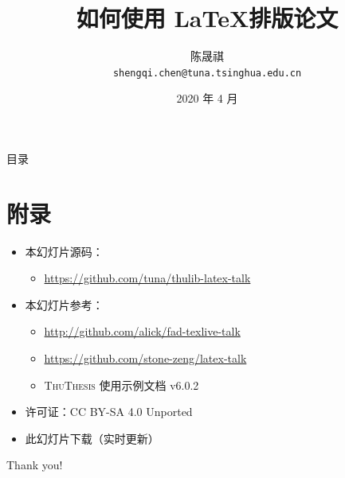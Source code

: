 \documentclass[xcolor=table,dvipsnames,svgnames,aspectratio=169,fontset=fandol,punct=kaiming]{ctexbeamer}
\title
{如何使用 \LaTeX 排版论文}
\author[陈晟祺] %
{陈晟祺\\ \texttt{shengqi.chen@tuna.tsinghua.edu.cn}}
\institute{清华大学 TUNA 协会}
\date[图书馆专题培训讲座]{2020 年 4 月}
\newcommand{\ThuThesis}{\textsc{ThuThesis}\xspace}
\newcommand\link[1]{\href{#1}{\faLink}}
\begin{document}
\begin{frame}
  \titlepage
\end{frame}

\begin{frame}{目录}
  \tableofcontents
\end{frame}







\section*{附录}


\begin{frame}
  \begin{itemize}
    \item 本幻灯片源码：
      \begin{itemize}
        \item \url{https://github.com/tuna/thulib-latex-talk}
      \end{itemize}
    \item 本幻灯片参考：
      \begin{itemize}
        \item \url{http://github.com/alick/fad-texlive-talk}
        \item \url{https://github.com/stone-zeng/latex-talk}
        \item \ThuThesis{} 使用示例文档 v6.0.2
      \end{itemize}
    \item 许可证：CC BY-SA 4.0 Unported \ccbysa
    \item 此幻灯片下载（实时更新） \link{https://stu.cs.tsinghua.edu.cn/\~harry/latex-talk.pdf} \hspace{1em}
  \end{itemize}
\end{frame}

\begin{frame}
  \begin{center}
    {\Huge\calligra Thank you!}
  \end{center}
\end{frame}
\end{document}
